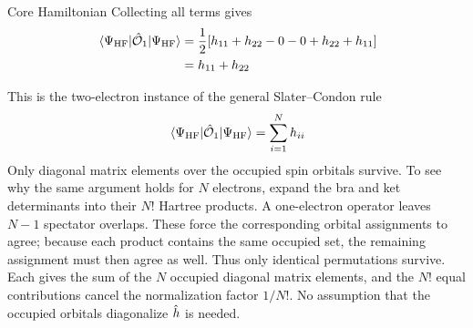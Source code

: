 \documentclass[11pt,a4paper,titlepage]{article}
\numberwithin{equation}{section}
\newcommand{\hh}{\Hat{h}}
\newcommand{\chO}{\Hat{\mathcal{O}}}
\begin{document}
\begin{hfsolution}{Core Hamiltonian}
Collecting all terms gives
\begin{equation}
\begin{split}
  \mel{\Psi_\text{HF}}{\chO_1}{\Psi_\text{HF}}
  &=
  \frac{1}{2}
  [h_{11}+h_{22}-0-0+h_{22}+h_{11}]
  \\
  &=
  h_{11}+h_{22}
\end{split}
\end{equation}

This is the two-electron instance of the general Slater--Condon rule
\begin{equation}
  \mel{\Psi_\text{HF}}{\chO_1}{\Psi_\text{HF}}
  =
  \sum_{i=1}^{N}h_{ii}
\end{equation}
Only diagonal matrix elements over the occupied spin orbitals survive.
To see why the same argument holds for $N$ electrons, expand the bra and
ket determinants into their $N!$ Hartree products. A one-electron operator
leaves $N-1$ spectator overlaps. These force the corresponding orbital
assignments to agree; because each product contains the same occupied set,
the remaining assignment must then agree as well. Thus only identical
permutations survive. Each gives the sum of the $N$ occupied diagonal
matrix elements, and the $N!$ equal contributions cancel the normalization
factor $1/N!$. No assumption that the occupied orbitals diagonalize
$\hh$ is needed.

\end{hfsolution}

\end{document}
